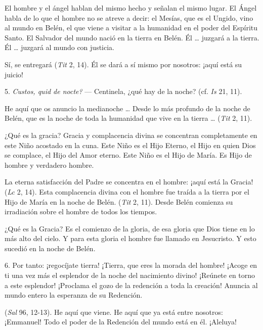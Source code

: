 \begin{body}
	El hombre y el ángel hablan del mismo hecho y señalan el mismo lugar. El Ángel habla de lo que el hombre no se atreve a decir: el Mesías, que es el Ungido, vino al mundo en Belén, el que viene a visitar a la humanidad en el poder del Espíritu Santo. El Salvador del mundo nació en la tierra en Belén. Él \ldots{} juzgará a la tierra. Él \ldots{} juzgará al mundo con justicia.
	
	Sí, se entregará  (\emph{Tit} 2, 14). Él se dará a sí mismo por nosotros: ¡aquí está su juicio!
	
	5. \emph{Custos, quid de nocte?} --- Centinela, ¿qué hay de la noche? (cf. \emph{Is} 21, 11).
	
	He aquí que os anuncio la medianoche \ldots{} Desde lo más profundo de la noche de Belén, que es la noche de toda la humanidad que vive en la tierra \ldots{}  (\emph{Tit} 2, 11).
	
	¿Qué es la gracia? Gracia y complacencia divina se concentran completamente en este Niño acostado en la cuna. Este Niño es el Hijo Eterno, el Hijo en quien Dios se complace, el Hijo del Amor eterno. Este Niño es el Hijo de María. Es Hijo de hombre y verdadero hombre.
	
	La eterna satisfacción del Padre se concentra en el hombre: ¡aquí está la Gracia!  (\emph{Lc} 2, 14). Esta complacencia divina con el hombre fue traída a la tierra por el Hijo de María en la noche de Belén.  (\emph{Tit} 2, 11). Desde Belén comienza su irradiación sobre el hombre de todos los tiempos.
	
	¿Qué es la Gracia? Es el comienzo de la gloria, de esa gloria que Dios tiene en lo más alto del cielo. Y para esta gloria el hombre fue llamado en Jesucristo. Y esto sucedió en la noche de Belén.
	
	6. Por tanto: ¡regocíjate tierra! ¡Tierra, que eres la morada del hombre! ¡Acoge en ti una vez más el esplendor de la noche del nacimiento divino! ¡Reúnete en torno a este esplendor! ¡Proclama el gozo de la redención a toda la creación! Anuncia al mundo entero la esperanza de su Redención.
	
	 (\emph{Sal} 96, 12-13). He aquí que viene. He aquí que ya está entre nosotros: ¡Emmanuel! Todo el poder de la Redención del mundo está en él. ¡Aleluya!
\end{body}

